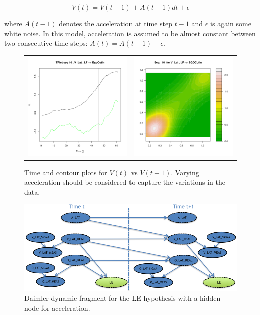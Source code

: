 \begin{equation}
V(t) =V(t-1) +A(t-1)dt +\epsilon
\end{equation}

\noindent where $A(t-1)$ denotes the acceleration at time step $t-1$ and $\epsilon$ is again some white noise. In this model, acceleration is assumed to be almost constant between two consecutive time steps: $A(t) = A(t-1) + \epsilon$. 

\begin{figure}
  \centering
  \setlength{\tabcolsep}{0.05pt}
  \renewcommand{\arraystretch}{0.02}
    \begin{tabular}{cc}
    \includegraphics[width=60mm]{figures/DaimlerLE_EGO_L_LE_OBJ_R_EGOCutInVel.pdf}&
    \includegraphics[width=60mm]{figures/DaimlerBivariate_temporal_analysisEGO_LVel.pdf}\\
  \end{tabular}
      \caption{ \label{Figure:daimlerVel}Time and contour plots for $V(t)$ vs $V(t-1)$. Varying acceleration should be considered to capture the variations in the data.}
\end{figure}

\begin{figure}
\begin{center}
\includegraphics[scale=0.58]{./figures/DaimlertempDynAccel}
\end{center}
\caption{\label{Figure:tempDynAccel}Daimler dynamic fragment for the LE hypothesis with a hidden node for acceleration.}
\end{figure}